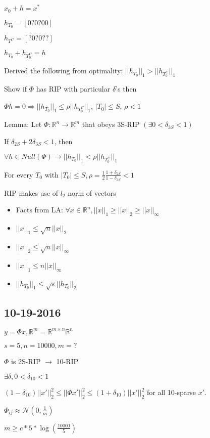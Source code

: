 \documentclass[12pt,letterpaper]{report}
\begin{document}
$x_0 + h = x^*$

$h_{T_0} = [0 ? 0 ? 0 0]$

$h_{T^C} = [? 0 ? 0 ? ?]$

$h_{T_0} + h_{T_0^C} = h$

Derived the following from optimality: $||h_{T_0}||_1 > ||h_{T_0^C}||_1$

Show if $\Phi$ has RIP with particular $\delta$'s then

$\Phi h = 0 \Rightarrow ||h_{T_0}||_1 \leq \rho ||h_{T_0^C}||_1$, $|T_0| \leq S$, $\rho < 1$


Lemma: Let $\Phi : \mathbb{R}^n \rightarrow \mathbb{R}^m$ that obeys 3S-RIP $(\exists 0 < \delta_{3S} < 1)$

If $\delta_{2S} + 2 \delta_{3S} < 1$, then

$\forall h \in Null(\Phi) \rightarrow ||h_{T_0}||_1 < \rho ||h_{T_0^C}||_1$

For every $T_0$ with $|T_0| \leq S, \rho = \frac{1}{2} \frac{1 + \delta_{2S}}{1 -\delta_{3S}} < 1$

RIP makes use of $l_2$ norm of vectors

\begin{itemize}
\item Facts from LA: $\forall x \in \mathbb{R}^n, ||x||_1 \geq ||x||_2 \geq ||x||_\infty$
\item $||x||_1 \leq \sqrt{n} ||x||_2$
\item $||x||_2 \leq \sqrt{n} ||x||_\infty$
\item $||x||_1 \leq n ||x||_\infty$
\item $||h_{T_0}||_1 \leq \sqrt{s} ||h_{T_0}||_2$
\end{itemize}

\subsection*{10-19-2016}

$y = \Phi x, \mathbb{R}^m = \mathbb{R}^{m \times n} \mathbb{R}^n$

$s = 5, n = 10000, m = ?$

$\Phi$ is 2S-RIP $\rightarrow$ 10-RIP

$\exists \delta, 0 < \delta_{10} < 1$

$(1-\delta_{10})||x'||_2^2 \leq ||\Phi x'||_2^2 \leq (1+\delta_{10})||x'||_2^2$ for all 10-sparse $x'$.

$\Phi_{ij} \approx \mathcal{N}(0, \frac{1}{m})$

$m \geq c * 5 * \log(\frac{10000}{5})$
\end{document}
